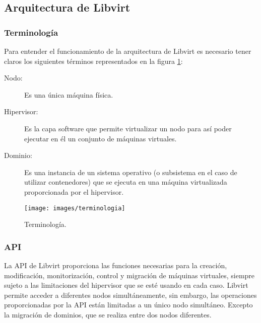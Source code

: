 \documentclass[spanisheDIVcalc,twoside,parskip-,pointlessnumbers,final]{scrbook}
\begin{document}
\subsection{Arquitectura de Libvirt}


\subsubsection{Terminología}

Para entender el funcionamiento de la arquitectura de Libvirt es necesario
tener claros los siguientes términos representados en la figura \ref{Terminologia Libvirt}:
\begin{description}
\item [{Nodo:}] Es una única máquina física.
\item [{Hipervisor:}] Es la capa software que permite virtualizar un nodo
para así poder ejecutar en él un conjunto de máquinas virtuales.
\item [{Dominio:}] Es una instancia de un sistema operativo (o subsistema
en el caso de utilizar contenedores) que se ejecuta en una máquina
virtualizada proporcionada por el hipervisor.
\end{description}
\begin{figure}[htpb]
\begin{centering}
\texttt{[image: images/terminologia]}
\par\end{centering}

\caption{Terminología.}
\label{Terminologia Libvirt}
\end{figure}



\subsubsection{API}

La API de Libvirt proporciona las funciones necesarias para la creación,
modificación, monitorización, control y migración de máquinas virtuales,
siempre sujeto a las limitaciones del hipervisor que se esté usando
en cada caso. Libvirt permite acceder a diferentes nodos simultáneamente,
sin embargo, las operaciones proporcionadas por la API están limitadas
a un único nodo simultáneo. Excepto la migración de dominios, que
se realiza entre dos nodos diferentes.
\end{document}
